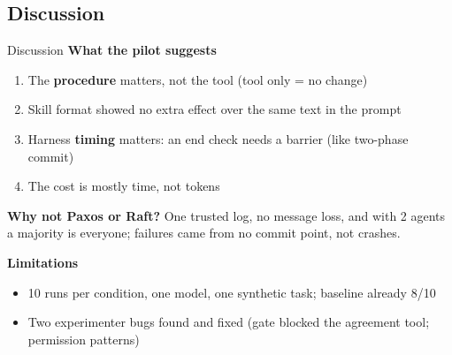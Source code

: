 \documentclass[aspectratio=169,11pt]{beamer}
\begin{document}
\subsection{Discussion}
\begin{frame}{Discussion}
  \small
  \textbf{What the pilot suggests}
  \begin{enumerate}
    \item The \textbf{procedure} matters, not the tool (tool only = no change)
    \item Skill format showed no extra effect over the same text in the prompt
    \item Harness \textbf{timing} matters: an end check needs a barrier (like two-phase commit)
    \item The cost is mostly time, not tokens
  \end{enumerate}
  \textbf{Why not Paxos or Raft?} One trusted log, no message loss, and with 2 agents a majority is everyone; failures came from no commit point, not crashes.

  \vspace{0.4em}
  \textbf{Limitations}
  \begin{itemize}
    \item 10 runs per condition, one model, one synthetic task; baseline already 8/10
    \item Two experimenter bugs found and fixed (gate blocked the agreement tool; permission patterns)
  \end{itemize}
\end{frame}

\end{document}
